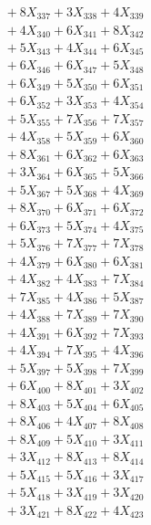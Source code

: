 \documentclass[a4paper,10pt]{article}
\begin{document}
{\begin{align}
&\;  + 8 X_{337} + 3 X_{338} + 4 X_{339} \\[0.5ex]\allowbreak
&\;  + 4 X_{340} + 6 X_{341} + 8 X_{342} \\[0.3ex]
&\;  + 5 X_{343} + 4 X_{344} + 6 X_{345} \\[0.3ex]
&\;  + 6 X_{346} + 6 X_{347} + 5 X_{348} \\[0.3ex]
&\;  + 6 X_{349} + 5 X_{350} + 6 X_{351} \\[0.3ex]
&\;  + 6 X_{352} + 3 X_{353} + 4 X_{354} \\[0.3ex]
&\;  + 5 X_{355} + 7 X_{356} + 7 X_{357} \\[0.3ex]
&\;  + 4 X_{358} + 5 X_{359} + 6 X_{360} \\[0.3ex]
&\;  + 8 X_{361} + 6 X_{362} + 6 X_{363} \\[0.3ex]
&\;  + 3 X_{364} + 6 X_{365} + 5 X_{366} \\[0.3ex]
&\;  + 5 X_{367} + 5 X_{368} + 4 X_{369} \\[0.5ex]\allowbreak
&\;  + 8 X_{370} + 6 X_{371} + 6 X_{372} \\[0.3ex]
&\;  + 6 X_{373} + 5 X_{374} + 4 X_{375} \\[0.3ex]
&\;  + 5 X_{376} + 7 X_{377} + 7 X_{378} \\[0.3ex]
&\;  + 4 X_{379} + 6 X_{380} + 6 X_{381} \\[0.3ex]
&\;  + 4 X_{382} + 4 X_{383} + 7 X_{384} \\[0.3ex]
&\;  + 7 X_{385} + 4 X_{386} + 5 X_{387} \\[0.3ex]
&\;  + 4 X_{388} + 7 X_{389} + 7 X_{390} \\[0.3ex]
&\;  + 4 X_{391} + 6 X_{392} + 7 X_{393} \\[0.3ex]
&\;  + 4 X_{394} + 7 X_{395} + 4 X_{396} \\[0.3ex]
&\;  + 5 X_{397} + 5 X_{398} + 7 X_{399} \\[0.5ex]\allowbreak
&\;  + 6 X_{400} + 8 X_{401} + 3 X_{402} \\[0.3ex]
&\;  + 8 X_{403} + 5 X_{404} + 6 X_{405} \\[0.3ex]
&\;  + 8 X_{406} + 4 X_{407} + 8 X_{408} \\[0.3ex]
&\;  + 8 X_{409} + 5 X_{410} + 3 X_{411} \\[0.3ex]
&\;  + 3 X_{412} + 8 X_{413} + 8 X_{414} \\[0.3ex]
&\;  + 5 X_{415} + 5 X_{416} + 3 X_{417} \\[0.3ex]
&\;  + 5 X_{418} + 3 X_{419} + 3 X_{420} \\[0.3ex]
&\;  + 3 X_{421} + 8 X_{422} + 4 X_{423} \\[0.3ex]

\end{align}}
\end{document}
